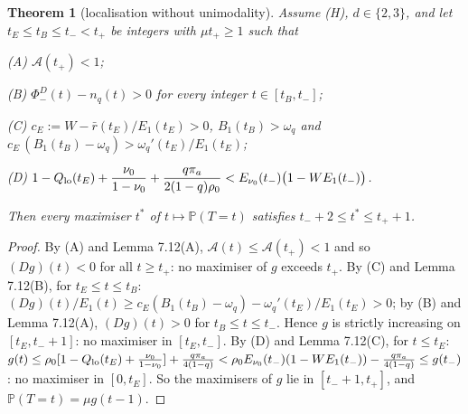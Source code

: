\documentclass[11pt,a4paper]{article}
\newtheorem{theorem}{Theorem}[section]
\theoremstyle{definition}
\theoremstyle{remark}
\begin{document}
\begin{theorem}[{localisation without unimodality}]
Assume (H), $d\in\{2,3\}$, and let $t_E\le t_B\le t_-<t_+$ be integers with $\mu t_+\ge1$ such that

(A) $\mathcal A(t_+)<1$;

(B) $\Phi^D_-(t)-n_q(t)>0$ for every integer $t\in[t_B,t_-]$;

(C) $c_E:=W-\bar r(t_E)/E_1(t_E)>0$, $B_1(t_B)>\omega_q$ and $c_E\,(B_1(t_B)-\omega_q)>\omega_q'(t_E)/E_1(t_E)$;

(D) $1-Q_{\rm lo}(t_E)+\dfrac{\nu_0}{1-\nu_0}+\dfrac{q\pi_a}{2(1-q)\rho_0}<E_{\nu_0}(t_-)\bigl(1-WE_1(t_-)\bigr)$.

Then every maximiser $t^*$ of $t\mapsto\mathbb P(T=t)$ satisfies $t_-+2\le t^*\le t_++1$.
\end{theorem}

\begin{proof}
By (A) and Lemma 7.12(A), $\mathcal A(t)\le\mathcal A(t_+)<1$ and so $(Dg)(t)<0$ for all $t\ge t_+$: no maximiser of $g$ exceeds $t_+$. By (C) and Lemma 7.12(B), for $t_E\le t\le t_B$: $(Dg)(t)/E_1(t)\ge c_E(B_1(t_B)-\omega_q)-\omega_q'(t_E)/E_1(t_E)>0$; by (B) and Lemma 7.12(A), $(Dg)(t)>0$ for $t_B\le t\le t_-$. Hence $g$ is strictly increasing on $[t_E,t_-+1]$: no maximiser in $[t_E,t_-]$. By (D) and Lemma 7.12(C), for $t\le t_E$: $g(t)\le\rho_0[1-Q_{\rm lo}(t_E)+\frac{\nu_0}{1-\nu_0}]+\frac{q\pi_a}{4(1-q)}<\rho_0E_{\nu_0}(t_-)(1-WE_1(t_-))-\frac{q\pi_a}{4(1-q)}\le g(t_-)$: no maximiser in $[0,t_E]$. So the maximisers of $g$ lie in $[t_-+1,t_+]$, and $\mathbb P(T=t)=\mu g(t-1)$.
\end{proof}
\end{document}
